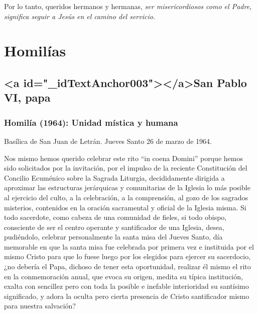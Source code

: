			\begin{body}Por lo tanto, queridos hermanos y hermanas, \textit{ser misericordiosos como el Padre, significa seguir a Jesús en el camino del servicio}.\end{body}
			
			\section{Homilías}
			
			\subsection{<a id="_idTextAnchor003"></a>San Pablo VI, papa}
			
			\subsubsection{Homilía (1964): Unidad mística y humana}
			
			\begin{referencia}Basílica de San Juan de Letrán. Jueves Santo 26 de marzo de 1964.\end{referencia}
			
			\begin{body} Nos mismo hemos querido celebrar este rito “in coena Domini” porque hemos sido solicitados por la invitación, por el impulso de la reciente Constitución del Concilio Ecuménico sobre la Sagrada Liturgia, decididamente dirigida a aproximar las estructuras jerárquicas y comunitarias de la Iglesia lo más posible al ejercicio del culto, a la celebración, a la comprensión, al gozo de los sagrados misterios, contenidos en la oración sacramental y oficial de la Iglesia misma. Si todo sacerdote, como cabeza de una comunidad de fieles, si todo obispo, consciente de ser el centro operante y santificador de una Iglesia, desea, pudiéndolo, celebrar personalmente la santa misa del Jueves Santo, día memorable en que la santa misa fue celebrada por primera vez e instituida por el mismo Cristo para que lo fuese luego por los elegidos para ejercer su sacerdocio, ¿no debería el Papa, dichoso de tener esta oportunidad, realizar él mismo el rito en la conmemoración anual, que evoca su origen, medita su típica institución, exalta con sencillez pero con toda la posible e inefable interioridad su santísimo significado, y adora la oculta pero cierta presencia de Cristo santificador mismo para nuestra salvación?\end{body}
			
